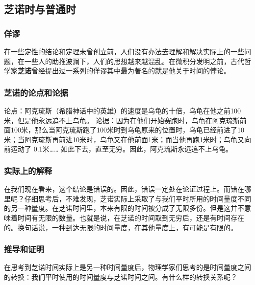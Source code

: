 

\begin{issues}

\end{issues}

\subsection{芝诺时与普通时}

\subsubsection{佯谬}
在一些定性的结论和定理未曾创立前，人们没有办法去理解和解决实际上的一些问题，在一些人的助推波澜下，人们的思想越来越混乱。在微积分发明之前，古代哲学家\textbf{芝诺}曾经提出过一系列的佯谬其中最为著名的就是他关于时间的悖论。

\subsubsection{芝诺的论点和论据}
论点：阿克琉斯（希腊神话中的英雄）的速度是乌龟的十倍，乌龟在他之前100米，但是他永远追不上乌龟。
论据：因为在他们开始赛跑时，乌龟在阿克琉斯前面100米，那么当阿克琉斯跑了100米时到乌龟原来的位置时，乌龟已经前进了10米；当阿克琉斯再前进10米时，乌龟又在他前面1米；而当他再跑1米时；乌龟又向前运动了  0.1米…… 如此下去，直至无穷。因此，阿克琉斯永远追不上乌龟。

\subsubsection{实际上的解释}
在我们现在看来，这个结论是错误的。因此，错误一定处在论证过程上。而错在哪里呢？仔细思考后，不难发现，芝诺实际上采取了与我们平时所用的时间量度不同的另一种量度。在芝诺时间里，本来有限的时间被分成了无限多份。但是这并不意味着时间有无限的数量。也就是说，在芝诺的时间取到无穷后，还是有时间存在的。换句话说，一种到达无限的时间量度，在其他量度上，有可能是有限的。

\subsubsection{推导和证明}
在思考到芝诺时间实际上是另一种时间量度后，物理学家们思考的是时间量度之间的转换：我们平时使用的时间量度与芝诺时间之间。有什么样的转换关系呢？

